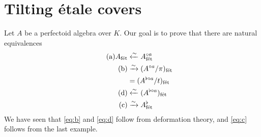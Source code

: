 \documentclass{article}
\begin{document}
\section{Tilting \'etale covers}

Let $A$ be a perfectoid algebra over $K$. Our goal is to prove that there are  
natural equivalences 
\begin{align*} \tag{a}
  A_{\textnormal{f\'et}} &\xleftarrow\sim A^{\circ a}_{\textnormal{f\'et}} \\ \tag{b}
  &\xrightarrow\sim (A^{\circ a}/\pi)_{\textnormal{f\'et}} \\
  &= (A^{\flat\circ a}/t)_{\textnormal{f\'et}} \\ \tag{d}
  &\xleftarrow\sim (A^{\flat\circ a})_{\textnormal{f\'et}} \\ \tag{c}
  &\xrightarrow\sim A^\flat_{\textnormal{f\'et}}
\end{align*}
We have seen that \eqref{eq:b} and \eqref{eq:d} follow from deformation theory, 
and \eqref{eq:c} follows from the last example. 







\end{document}
